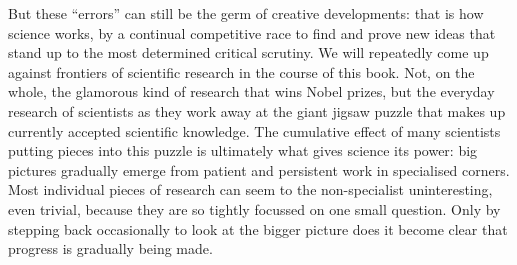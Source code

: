  But these ``errors'' can still be the germ of creative developments: that is 
  how science works, by a continual competitive race to find and prove new 
  ideas that stand up to the most determined critical scrutiny. We will 
  repeatedly come up against frontiers of scientific research in the course of 
  this book. Not, on the whole, the glamorous kind of research that wins Nobel 
  prizes, but the everyday research of scientists as they work away at the 
  giant jigsaw puzzle that makes up currently accepted scientific knowledge. 
  The cumulative effect of many scientists putting pieces into this puzzle is 
  ultimately what gives science its power: big pictures gradually emerge from 
  patient and persistent work in specialised corners. Most individual pieces of 
  research can seem to the non-specialist uninteresting, even trivial, because 
  they are so tightly focussed on one small question. Only by stepping back 
  occasionally to look at the bigger picture does it become clear that progress 
  is gradually being made. 

